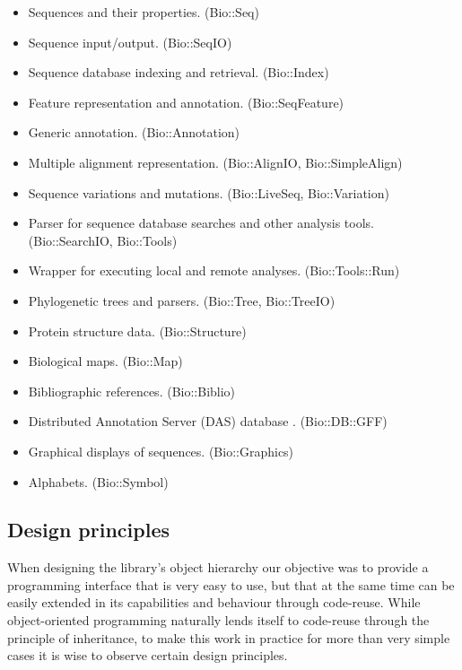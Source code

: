 \documentclass[twocolumn]{article}
\begin{document}
\begin{itemize}
\item Sequences and their properties. (Bio::Seq)
\item Sequence input/output.  (Bio::SeqIO) 
\item Sequence database indexing and retrieval. (Bio::Index) 
\item Feature representation and annotation. (Bio::SeqFeature)
\item Generic annotation. (Bio::Annotation)
\item Multiple alignment representation. (Bio::AlignIO, Bio::SimpleAlign)
\item Sequence variations and mutations. (Bio::LiveSeq, Bio::Variation)
\item Parser for sequence database searches and other analysis
tools. (Bio::SearchIO, Bio::Tools)
\item Wrapper for executing local and remote analyses. (Bio::Tools::Run)
\item Phylogenetic trees and parsers. (Bio::Tree, Bio::TreeIO)
\item Protein structure data. (Bio::Structure)
\item Biological maps. (Bio::Map)
\item Bibliographic references. (Bio::Biblio)
\item Distributed Annotation Server (DAS) database \cite{das}. (Bio::DB::GFF)
\item Graphical displays of sequences. (Bio::Graphics)
\item Alphabets. (Bio::Symbol)


\end{itemize}

\subsection{Design principles}

When designing the library's object hierarchy our objective was to
provide a programming interface that is very easy to use, but that at
the same time can be easily extended in its capabilities and behaviour
through code-reuse.  While object-oriented programming naturally lends
itself to code-reuse through the principle of inheritance, to make
this work in practice for more than very simple cases it is wise to
observe certain design principles.  
\end{document}
